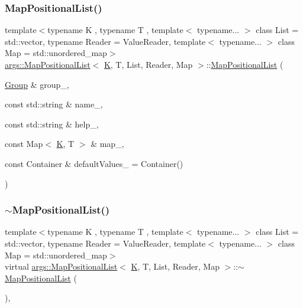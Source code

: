 \subsubsection{\texorpdfstring{Map\+Positional\+List()}{MapPositionalList()}}
{\footnotesize\ttfamily template$<$typename K , typename T , template$<$ typename... $>$ class List = std\+::vector, typename Reader  = Value\+Reader, template$<$ typename... $>$ class Map = std\+::unordered\+\_\+map$>$ \\
\hyperlink{classargs_1_1_map_positional_list}{args\+::\+Map\+Positional\+List}$<$ \hyperlink{cgal__test_8cpp_a891e241aa245ae63618f03737efba309}{K}, T, List, Reader, Map $>$\+::\hyperlink{classargs_1_1_map_positional_list}{Map\+Positional\+List} (\begin{DoxyParamCaption}\item[{\hyperlink{classargs_1_1_group}{Group} \&}]{group\+\_\+,  }\item[{const std\+::string \&}]{name\+\_\+,  }\item[{const std\+::string \&}]{help\+\_\+,  }\item[{const Map$<$ \hyperlink{cgal__test_8cpp_a891e241aa245ae63618f03737efba309}{K}, T $>$ \&}]{map\+\_\+,  }\item[{const Container \&}]{default\+Values\+\_\+ = {\ttfamily Container()} }\end{DoxyParamCaption})\hspace{0.3cm}{\ttfamily [inline]}}

\mbox{\label{classargs_1_1_map_positional_list_acd2d9a2a9dafb35ff7d85b2aebe4d94e}} 
\subsubsection{\texorpdfstring{$\sim$\+Map\+Positional\+List()}{~MapPositionalList()}}
{\footnotesize\ttfamily template$<$typename K , typename T , template$<$ typename... $>$ class List = std\+::vector, typename Reader  = Value\+Reader, template$<$ typename... $>$ class Map = std\+::unordered\+\_\+map$>$ \\
virtual \hyperlink{classargs_1_1_map_positional_list}{args\+::\+Map\+Positional\+List}$<$ \hyperlink{cgal__test_8cpp_a891e241aa245ae63618f03737efba309}{K}, T, List, Reader, Map $>$\+::$\sim$\hyperlink{classargs_1_1_map_positional_list}{Map\+Positional\+List} (\begin{DoxyParamCaption}{ }\end{DoxyParamCaption})\hspace{0.3cm}{\ttfamily [inline]}, {\ttfamily [virtual]}}



